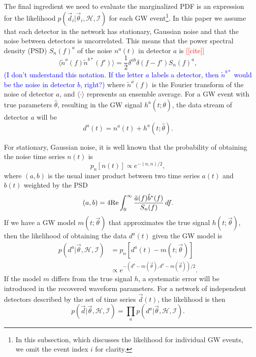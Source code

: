 \documentclass[twocolumn,prd,amssymb,aps,nofootinbib,showpacs,epsf]{revtex4}
\newcommand{\red}{\textcolor{red}}
\newcommand\les[2]{\textcolor{blue}{{#1}\sout{#2}}}
\begin{document}
The final ingredient we need to evaluate the marginalized PDF is an expression for the likelihood $p(\vec d_i | \vec\theta_i,\mathcal{H},\mathcal{I})$ for each GW event\footnote{In this subsection, which discusses the likelihood for individual GW events, we omit the event index $i$ for clarity.}. In this paper we assume that each detector in the network has stationary, Gaussian noise and that the noise between detectors is uncorrelated. This means that the power spectral density (PSD) $S_n(f)^a$ of the noise $n^a(t)$ in detector $a$ is \red{[[cite]]}
\begin{equation}
\langle \tilde n^a(f) \tilde n^{b*}(f') \rangle = \frac{1}{2} \delta^{ab} \delta (f-f') S_n(f)^a,
\end{equation}
\les{(I don't understand this notation.  If the letter $a$ labels a detector, then $\tilde{n}^{b*}$ would be the noise in detector $b$, right?)}{} where $\tilde n^a(f)$ is the Fourier transform of the noise of detector $a$, and $\langle\cdot\rangle$ represents an ensemble average. For a GW event with true parameters $\hat\theta$, resulting in the GW signal $h^a(t; \hat\theta)$, the data stream of detector $a$ will be
\begin{equation}
d^a(t) = n^a(t) + h^a(t; \hat\theta).
\end{equation}

For stationary, Gaussian noise, it is well known that the probability of obtaining the noise time series $n(t)$ is
\begin{equation}
p_n[n(t)] \propto e^{-(n, n)/2},
\end{equation}
where $(a, b)$ is the usual inner product between two time series $a(t)$ and $b(t)$ weighted by the PSD
\begin{equation}
(a, b)=4{\rm Re} \int_0^\infty \frac{\tilde a(f) \tilde b^*(f)}{S_n(f)}\,df.
\end{equation}
If we have a GW model $m(t;\vec\theta)$ that approximates the true signal $h(t;\vec\theta)$, then the likelihood of obtaining the data $d^a(t)$ given the GW model is
\begin{align}
p(d^a | \vec\theta, \mathcal{H}, \mathcal{I}) &= p_n[d^a(t)-m(t; \vec\theta)] \nonumber\\
& \propto e^{-(d^a - m(\vec\theta), d^a - m(\vec\theta))/2}.
\end{align}
If the model $m$ differs from the true signal $h$, a systematic error will be introduced in the recovered waveform parameters. For a network of independent detectors described by the set of time series $\vec d(t)$, the likelihood is then
\begin{equation}
p(\vec d | \vec\theta, \mathcal{H}, \mathcal{I}) = \prod_a p(d^a | \vec\theta, \mathcal{H}, \mathcal{I}).
\end{equation}
\end{document}
